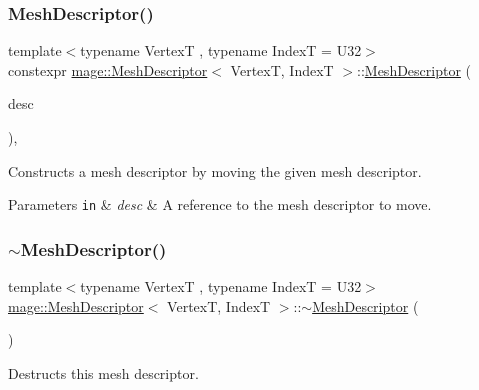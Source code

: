 \subsubsection{\texorpdfstring{Mesh\+Descriptor()}{MeshDescriptor()}\hspace{0.1cm}{\footnotesize\ttfamily [3/3]}}
{\footnotesize\ttfamily template$<$typename VertexT , typename IndexT  = U32$>$ \\
constexpr \hyperlink{structmage_1_1_mesh_descriptor}{mage\+::\+Mesh\+Descriptor}$<$ VertexT, IndexT $>$\+::\hyperlink{structmage_1_1_mesh_descriptor}{Mesh\+Descriptor} (\begin{DoxyParamCaption}\item[{\hyperlink{structmage_1_1_mesh_descriptor}{Mesh\+Descriptor}$<$ VertexT, IndexT $>$ \&\&}]{desc }\end{DoxyParamCaption})\hspace{0.3cm}{\ttfamily [default]}, {\ttfamily [noexcept]}}

Constructs a mesh descriptor by moving the given mesh descriptor.


\begin{DoxyParams}[1]{Parameters}
\mbox{\tt in}  & {\em desc} & A reference to the mesh descriptor to move. \\
\hline
\end{DoxyParams}
\hypertarget{structmage_1_1_mesh_descriptor_a7a2998a335d355ea366df8df1b1df0e5}{}\label{structmage_1_1_mesh_descriptor_a7a2998a335d355ea366df8df1b1df0e5} 
\subsubsection{\texorpdfstring{$\sim$\+Mesh\+Descriptor()}{~MeshDescriptor()}}
{\footnotesize\ttfamily template$<$typename VertexT , typename IndexT  = U32$>$ \\
\hyperlink{structmage_1_1_mesh_descriptor}{mage\+::\+Mesh\+Descriptor}$<$ VertexT, IndexT $>$\+::$\sim$\hyperlink{structmage_1_1_mesh_descriptor}{Mesh\+Descriptor} (\begin{DoxyParamCaption}{ }\end{DoxyParamCaption})\hspace{0.3cm}{\ttfamily [default]}}

Destructs this mesh descriptor. 

